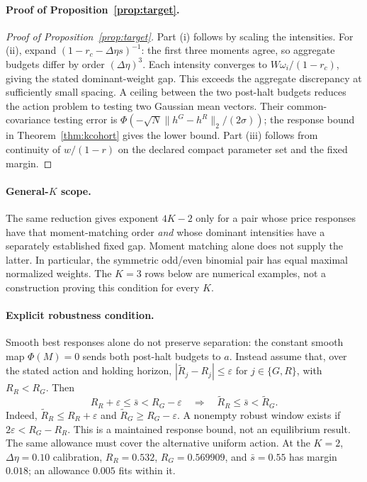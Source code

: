 \documentclass[12pt]{article}
\theoremstyle{definition}
\theoremstyle{remark}
\begin{document}
\paragraph{Proof of Proposition~\ref{prop:target}.}
\begin{proof}[Proof of Proposition~\ref{prop:target}]
Part (i) follows by scaling the intensities. For (ii), expand $(1-r_c-\Delta\eta s)^{-1}$: the first three moments agree, so aggregate budgets differ by order $(\Delta\eta)^3$. Each intensity converges to $W\omega_i/(1-r_c)$, giving the stated dominant-weight gap. This exceeds the aggregate discrepancy at sufficiently small spacing. A ceiling between the two post-halt budgets reduces the action problem to testing two Gaussian mean vectors. Their common-covariance testing error is $\Phi(-\sqrt N\|h^G-h^R\|_2/(2\sigma))$; the response bound in Theorem~\ref{thm:kcohort} gives the lower bound. Part (iii) follows from continuity of $w/(1-r)$ on the declared compact parameter set and the fixed margin.
\end{proof}

\paragraph{General-$K$ scope.} The same reduction gives exponent $4K-2$ only for a pair whose price responses have that moment-matching order \emph{and} whose dominant intensities have a separately established fixed gap. Moment matching alone does not supply the latter. In particular, the symmetric odd/even binomial pair has equal maximal normalized weights. The $K=3$ rows below are numerical examples, not a construction proving this condition for every $K$.

\paragraph{Explicit robustness condition.} Smooth best responses alone do not preserve separation: the constant smooth map $\Phi(M)=0$ sends both post-halt budgets to $a$. Instead assume that, over the stated action and holding horizon, $|\widetilde R_j-R_j|\le\varepsilon$ for $j\in\{G,R\}$, with $R_R<R_G$. Then
\begin{equation}\label{eq:reopt_gap}
 R_R+\varepsilon\le\bar s<R_G-\varepsilon
 \quad\Longrightarrow\quad \widetilde R_R\le\bar s<\widetilde R_G.
\end{equation}
Indeed, $\widetilde R_R\le R_R+\varepsilon$ and $\widetilde R_G\ge R_G-\varepsilon$. A nonempty robust window exists if $2\varepsilon<R_G-R_R$. This is a maintained response bound, not an equilibrium result. The same allowance must cover the alternative uniform action. At the $K=2$, $\Delta\eta=0.10$ calibration, $R_R=0.532$, $R_G=0.569909$, and $\bar s=0.55$ has margin $0.018$; an allowance $0.005$ fits within it.
\end{document}
